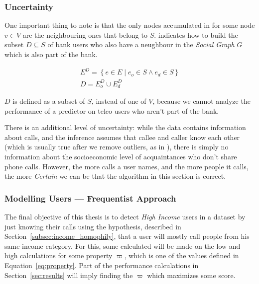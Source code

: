 \subsubsection{Uncertainty}
\label{subsec:uncertainty}

One important thing to note is that the only nodes accumulated in  for some node $v \in V$ are the neighbouring ones that belong to $S$.  indicates how to build the subset $D \subseteq S$ of bank users who also have a neughbour in the \emph{Social Graph} $G$ which is also part of the bank.

\begin{equation}
\label{eq:subset_neighbours}
\begin{gathered}
E^D = \left\{ e \in E \mid e_o \in S \land e_d \in S \right\} \\
D = E^D_o \cup E^D_d
\end{gathered}
\end{equation}

$D$ is defined as a subset of $S$, instead of one of $V$, because we cannot analyze the performance of a predictor on telco users who aren't part of the bank.

There is an additional level of uncertainty: while the data contains information about calls, and the inference assumes that callee and caller know each other (which is usually true after we remove outliers, as in ), there is simply no information about the socioeconomic level of acquaintances who don't share phone calls. However, the more calls a user names, and the more people it calls, the more \emph{Certain} we can be that the algorithm in this section is correct.

\subsubsection{Modelling Users --- Frequentist Approach}
\label{subsec:modelling_users_frequentist}

The final objective of this thesis is to detect \emph{High Income} users in a dataset by just knowing their calls using the hypothesis, described in Section~\ref{subsec:income_homophily}, that a user will mostly call people from his same income category. For this, some calculated will be made on the low and high calculations for some property $\varpi$\footnotemark{}, which is one of the values defined in Equation~\ref{eq:property}. Part of the performance calculations in Section~\ref{sec:results} will imply finding the $\varpi$ which maximizes some score.

